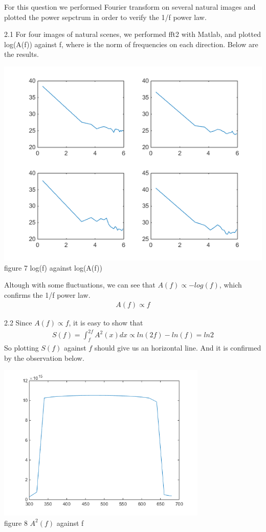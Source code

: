 \documentclass[12pt]{article}
\newenvironment{problem}[2][Problem]{\begin{trivlist}
\item[\hskip \labelsep {\bfseries #1}\hskip \labelsep {\bfseries #2}]}{\end{trivlist}}
\begin{document}
\begin{problem}{2. Verify the 1/f Power Law in Natural Images}
\item{}
For this question we performed Fourier transform on several natural images and plotted the power sepctrum in order to verify the 1/f power law.\\
\item{2.1}
For four images of natural scenes, we performed fft2 with Matlab, and plotted log(A(f)) against f, where is the norm of frequencies on each direction. Below are the results.
\begin{center}
		\includegraphics[width=14cm]{results/q2_1.png}{\\figure 7 log(f) against log(A(f))}
\end{center}
Altough with some fluctuations, we can see that $A(f) \propto -log(f)$, which confirms the 1/f power law.
\begin{align*}
	A(f) \propto f
\end{align*}
\item{2.2}
Since $A(f) \propto f$, it is easy to show that
\begin{align*}
	S(f) = \int_{f}^{2f} A^2(x) dx \propto ln(2f) - ln(f) = ln2
\end{align*}
So plotting $S(f)$ against $f$ should give us an horizontal line. And it is confirmed by the observation below.
\begin{center}
		\includegraphics[width=10cm]{results/q2_2.png}{\\figure 8 $A^2(f)$ against f}
\end{center}
\end{problem}
\end{document}
